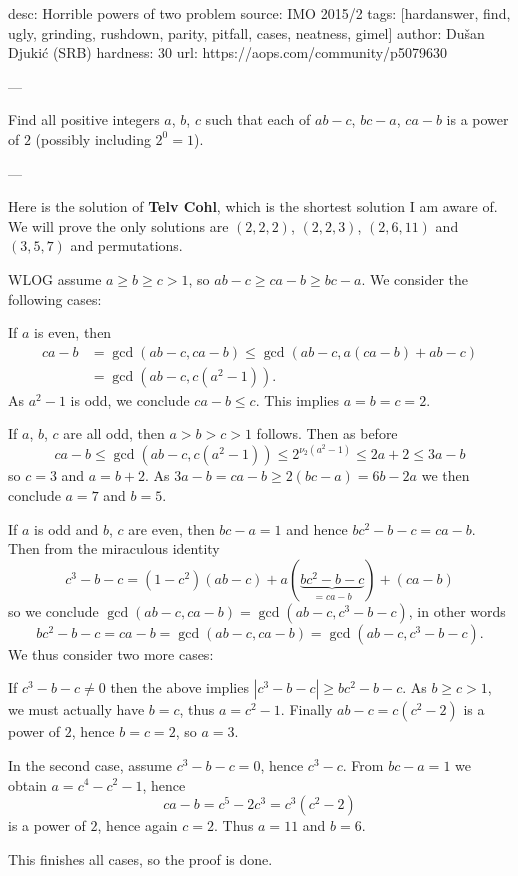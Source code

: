 desc:  Horrible powers of two problem
source:  IMO 2015/2
tags:  [hardanswer, find, ugly, grinding, rushdown, parity, pitfall, cases, neatness, gimel]
author: Dušan Djukić (SRB)
hardness: 30
url: https://aops.com/community/p5079630

---

Find all positive integers $a$, $b$, $c$ such that
each of $ab-c$, $bc-a$, $ca-b$ is a power of $2$
(possibly including $2^0=1$).

---

Here is the solution of \textbf{Telv Cohl},
which is the shortest solution I am aware of.
We will prove the only solutions are $(2,2,2)$, $(2,2,3)$,
$(2,6,11)$ and $(3,5,7)$ and permutations.

WLOG assume $a \ge b \ge c > 1$, so $ab-c \ge ca-b \ge bc-a$.
We consider the following cases:
\begin{itemize}
  \ii If $a$ is even, then
  \begin{align*}
    ca-b &= \gcd (ab-c, ca-b) \le \gcd (ab-c, a(ca-b)+ab-c) \\
    &= \gcd\left( ab-c, c(a^2-1) \right).
  \end{align*}
  As $a^2-1$ is odd, we conclude $ca-b \le c$.
  This implies $a=b=c=2$.

  \ii If $a$, $b$, $c$ are all odd, then $a > b > c > 1$ follows.
  Then as before
  \[  ca-b \le \gcd (ab-c, c(a^2-1))
    \le 2^{\nu_2(a^2-1)} \le 2a+2 \le 3a-b \]
  so $c = 3$ and $a = b+2$.
  As $3a-b = ca-b \ge 2(bc-a) = 6b-2a$ we then conclude $a=7$ and $b=5$.

  \ii If $a$ is odd and $b$, $c$ are even, then $bc-a=1$
  and hence $bc^2 - b - c = ca - b$.
  Then from the miraculous identity
  \[ c^3-b-c = (1-c^2)(ab-c) + a(\underbrace{bc^2-b-c}_{=ca-b}) + (ca-b) \]
  so we conclude $\gcd(ab-c, ca-b) = \gcd(ab-c, c^3-b-c)$, in other words
  \[ bc^2-b-c = ca-b = \gcd(ab-c, ca-b) = \gcd(ab-c, c^3-b-c). \]
  We thus consider two more cases:
  \begin{itemize}
    \ii If $c^3-b-c \neq 0$ then
    the above implies $|c^3-b-c| \ge bc^2-b-c$.
    As $b \ge c > 1$, we must actually have $b = c$,
    thus $a = c^2-1$.
    Finally $ab-c = c(c^2-2)$ is a power of $2$, hence $b=c=2$, so $a=3$.

    \ii In the second case, assume $c^3-b-c = 0$, hence $c^3-c$.
    From $bc-a=1$ we obtain $a=c^4-c^2-1$,
    hence
    \[ ca-b = c^5-2c^3 = c^3(c^2-2) \]
    is a power of $2$, hence again $c = 2$.
    Thus $a=11$ and $b=6$.
  \end{itemize}
\end{itemize}
This finishes all cases, so the proof is done.

